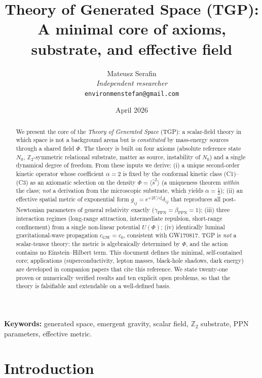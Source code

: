 \documentclass[11pt,a4paper]{article}
\title{%
  \textbf{Theory of Generated Space (TGP):}\\[4pt]
  \large A minimal core of axioms, substrate, and effective field%
}
\author{Mateusz Serafin\\[2pt]
\small\textit{Independent researcher}\\[-2pt]
\small\texttt{environmenstefan@gmail.com}}
\date{April 2026}
\renewcommand{\Phi}{\varPhi}
\newcommand{\Nzero}{N_{0}}
\newcommand{\Zp}{\mathbb{Z}_{2}}
\begin{document}
\maketitle

\begin{abstract}
We present the core of the \emph{Theory of Generated Space} (TGP):
a scalar-field theory in which space is not a background arena but is
\emph{constituted} by mass-energy sources through a shared field $\Phi$.
The theory is built on four axioms
(absolute reference state $\Nzero$, $\Zp$-symmetric relational substrate,
matter as source, instability of $\Nzero$) and a single dynamical degree of freedom.
From these inputs we derive:
(i) a unique second-order kinetic operator whose coefficient $\alpha=2$ is
fixed by the conformal kinetic class (C1)--(C3) as an axiomatic selection on
the density $\Phi=\langle\hat s^2\rangle$ (a uniqueness theorem \emph{within}
the class; \emph{not} a derivation from the microscopic substrate, which
yields $\alpha=\tfrac12$);
(ii) an effective spatial metric of exponential form $g_{ij}=e^{+2U/c_{0}^{2}}\delta_{ij}$
that reproduces all post-Newtonian parameters of general relativity exactly
($\gamma_{\mathrm{PPN}}=\beta_{\mathrm{PPN}}=1$);
(iii) three interaction regimes (long-range attraction, intermediate repulsion,
short-range confinement) from a single non-linear potential $U(\Phi)$;
(iv) identically luminal gravitational-wave propagation
$c_{\mathrm{GW}}=c_{0}$, consistent with GW170817.
TGP is \emph{not} a scalar-tensor theory: the metric is algebraically determined
by $\Phi$, and the action contains no Einstein--Hilbert term.
This document defines the minimal, self-contained core; applications
(superconductivity, lepton masses, black-hole shadows, dark energy) are
developed in companion papers that cite this reference.
We state twenty-one proven or numerically verified results and ten
explicit open problems, so that the theory is falsifiable and extendable
on a well-defined basis.
\end{abstract}

\noindent\textbf{Keywords:}
generated space, emergent gravity, scalar field, $\Zp$ substrate,
PPN parameters, effective metric.

\tableofcontents
\newpage

\section{Introduction}\label{sec:intro}
\end{document}
